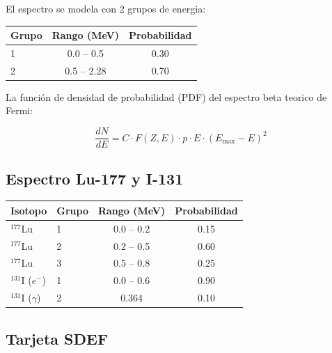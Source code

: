 \documentclass[12pt,a4paper]{article}
\begin{document}

El espectro se modela con 2 grupos de energia:

\begin{center}
\begin{tabular}{lcc}
\toprule
\textbf{Grupo} & \textbf{Rango (MeV)} & \textbf{Probabilidad} \\
\midrule
1 & 0.0 -- 0.5 & 0.30 \\
2 & 0.5 -- 2.28 & 0.70 \\
\bottomrule
\end{tabular}
\end{center}

La función de densidad de probabilidad (PDF) del espectro beta teorico de Fermi:

$$
\frac{dN}{dE} = C \cdot F(Z, E) \cdot p \cdot E \cdot (E_{\max} - E)^2
$$


\subsection{Espectro Lu-177 y I-131}

\begin{center}
\begin{tabular}{llcc}
\toprule
\textbf{Isotopo} & \textbf{Grupo} & \textbf{Rango (MeV)} & \textbf{Probabilidad} \\
\midrule
$^{177}$Lu & 1 & 0.0 -- 0.2 & 0.15 \\
$^{177}$Lu & 2 & 0.2 -- 0.5 & 0.60 \\
$^{177}$Lu & 3 & 0.5 -- 0.8 & 0.25 \\
\midrule
$^{131}$I ($e^-$) & 1 & 0.0 -- 0.6 & 0.90 \\
$^{131}$I ($\gamma$) & 2 & 0.364 & 0.10 \\
\bottomrule
\end{tabular}
\end{center}

\subsection{Tarjeta SDEF}
\end{document}

